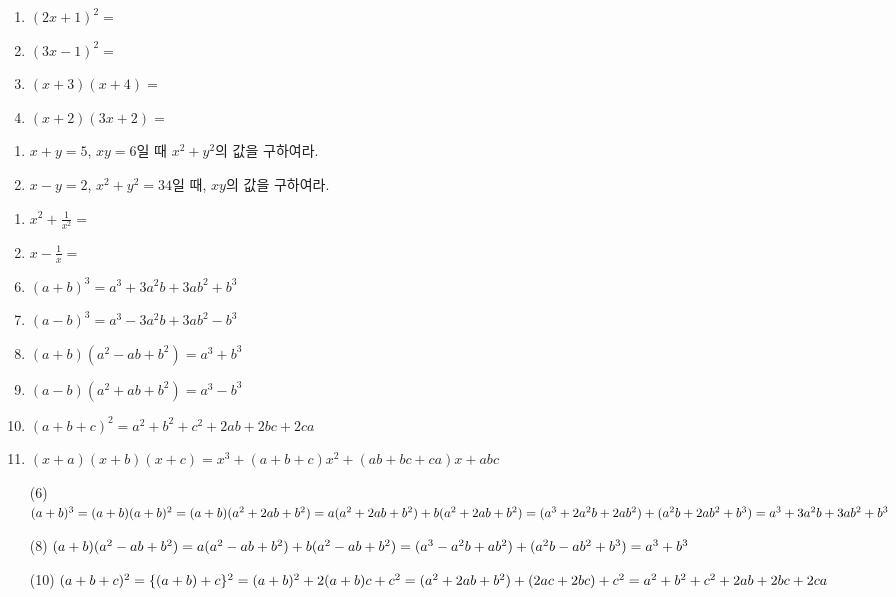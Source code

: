\documentclass{oblivoir}
\begin{document}
%
\begin{enumerate}[(1)]
\item
\((2x+1)^2=\)
\item
\((3x-1)^2=\)
\item
\((x+3)(x+4)=\)
\item
\((x+2)(3x+2)=\)
\end{enumerate}

%
\prob{}
\begin{enumerate}[(1)]
\item
\(x+y=5\), \(xy=6\)일 때 \(x^2+y^2\)의 값을 구하여라.
\item
\(x-y=2\), \(x^2+y^2=34\)일 때, \(xy\)의 값을 구하여라.
\end{enumerate}

%
\begin{enumerate}[(1)]
\item
\(x^2+\frac1{x^2}=\)
\item
\(x-\frac1x=\)
\end{enumerate}

\newpage
%
\begin{mdframed}
\begin{enumerate}[(1)]
\setcounter{enumi}{5}
\item
\((a+b)^3=a^3+3a^2b+3ab^2+b^3\)
\item
\((a-b)^3=a^3-3a^2b+3ab^2-b^3\)
\item
\((a+b)(a^2-ab+b^2)=a^3+b^3\)
\item
\((a-b)(a^2+ab+b^2)=a^3-b^3\)
\item
\((a+b+c)^2=a^2+b^2+c^2+2ab+2bc+2ca\)
\item
\((x+a)(x+b)(x+c)=x^3+(a+b+c)x^2+(ab+bc+ca)x+abc\)
\end{enumerate}
\end{mdframed}

%
\begin{enumerate}[(1)]
\item[(6)]
\((a+b)^3=(a+b)(a+b)^2=(a+b)(a^2+2ab+b^2)\\
=a(a^2+2ab+b^2)+b(a^2+2ab+b^2) =(a^3+2a^2b+2ab^2)+(a^2b+2ab^2+b^3)\\
=a^3+3a^2b+3ab^2+b^3\)
\item[(8)]
\((a+b)(a^2-ab+b^2)=a(a^2-ab+b^2)+b(a^2-ab+b^2)\\
=(a^3-a^2b+ab^2)+(a^2b-ab^2+b^3)=a^3+b^3\)
\item[(10)]
\((a+b+c)^2=\{(a+b)+c\}^2=(a+b)^2+2(a+b)c+c^2\\
=(a^2+2ab+b^2)+(2ac+2bc)+c^2=a^2+b^2+c^2+2ab+2bc+2ca\)
\end{enumerate}
\end{document}
